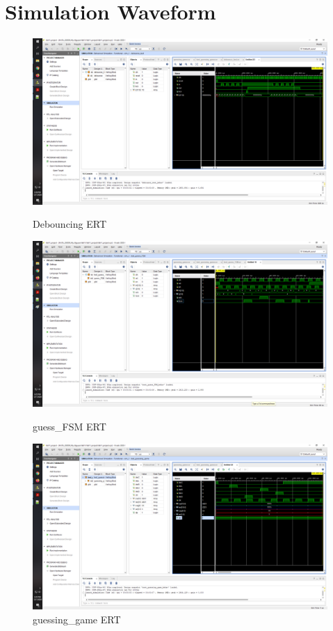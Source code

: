 \documentclass[11pt]{article}
\begin{document}
\section*{Simulation Waveform}
\begin{figure}[ht]
	\centering
	\includegraphics[width=\textwidth,trim=24cm 18cm 0.5cm 5.5cm,clip]{"debouncing"}
	\caption{Debouncing ERT}
	\includegraphics[width=\textwidth,trim=24cm 17.5cm 0.5cm 5.5cm,clip]{"guess_FSM"}
	\caption{guess\_FSM ERT}
	\includegraphics[width=\textwidth,trim=24cm 15cm 0.5cm 5.5cm,clip]{"guessing_game"}
	\caption{guessing\_game ERT}
\end{figure}
\end{document}
